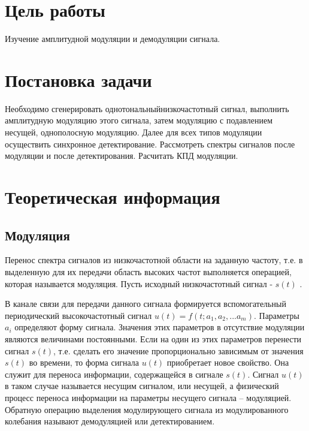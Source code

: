 

\setcounter{tocdepth}{3}







\section{Цель работы}
Изучение амплитудной модуляции и демодуляции сигнала.

\section{Постановка задачи}
Необходимо сгенерировать однотональныйнизкочастотный сигнал, выполнить амплитудную модуляцию этого сигнала, затем модуляцию с подавлением несущей, однополосную модуляцию. Далее для всех типов модуляции осуществить синхронное детектирование. Рассмотреть спектры сигналов после модуляции и после детектирования. Расчитать КПД модуляции.

\section{Теоретическая информация}

\subsection{Модуляция}
Перенос спектра сигналов из низкочастотной области на заданную частоту, т.е. в выделенную для их передачи область высоких частот выполняется операцией, которая называется модуляция. Пусть исходный низкочастотный сигнал - $s(t)$ .

В канале связи для передачи данного сигнала формируется вспомогательный периодический высокочастотный сигнал $u(t)   =   f(t;   a_1,   a_2,   ...   a_m)$. Параметры $a_i$ определяют форму сигнала. Значения этих параметров в отсутствие модуляции являются величинами постоянными. Если на один из этих параметров перенести сигнал $s(t)$, т.е. сделать его значение пропорционально зависимым от значения $s(t)$ во времени, то форма сигнала $u(t)$ приобретает новое свойство. Она служит для переноса информации, содержащейся в сигнале $s(t)$. Сигнал $u(t)$ в таком случае называется несущим сигналом, или несущей,  а физический процесс переноса информации на
параметры несущего сигнала – модуляцией. Обратную операцию выделения модулирующего сигнала из модулированного колебания называют демодуляцией или детектированием.

